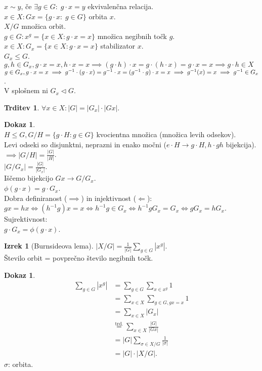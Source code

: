 \documentclass[a4paper, 12pt]{book}
\theoremstyle{definition}
\newtheorem{claim}[counter]{Trditev}
\newtheorem{theorem}[counter]{Izrek}
\newtheorem{pro}[counter]{Dokaz}
\theoremstyle{remark}
\begin{document}
$x \sim y$, če $\exists g \in G: \; g \cdot x = y$ ekvivalenčna relacija. \\
$x \in X: G x = \{g \cdot x: \; g \in G\}$ orbita $x$. \\
$X / G$ množica orbit. \\
$g \in G: x^g = \{x \in X: g \cdot x = x\}$ množica negibnih točk $g$. \\
$x \in X: G_x = \{x \in X: g \cdot x = x\}$ stabilizator $x$. \\
$G_x \leq G$. \\
$g, h \in G_x, g \cdot x = x, h \cdot x = x \implies (g \cdot h) \cdot x = g \cdot (h \cdot x) =
g \cdot x = x \implies g \cdot h \in X$ \\
$g \in G_x, g \cdot x = x \implies g^{-1} \cdot (g \cdot x) = g^{-1} \cdot x = (g^{-1} \cdot g) \cdot x = x \\
\implies g^{-1}(x) = x \implies g^{-1} \in G_x$. \\
V splošnem ni $G_x \triangleleft G$.
\begin{claim}
  $\forall x \in X: |G| = |G_x| \cdot |G x|$.
\end{claim}
\begin{pro} \text{} \\
  $H \leq G, G / H = \{g \cdot H: g \in G\}$ kvocientna množica (množica levih odsekov). \\
  Levi odseki so disjunktni, neprazni in enako močni ($e \cdot H \to g \cdot H, h \cdot g h$ bijekcija). \\
  $\implies |G / H| = \frac{|G|}{|H|}$. \\
  $|G / G_x| = \frac{|G|}{|G_x|}$. \\
  Iščemo bijekcijo $G x \to G / G_x$. \\
  $\phi(g \cdot x) = g \cdot G_x$. \\
  Dobra definiranost ($\implies$) in injektivnost ($\Longleftarrow$): \\
  $g x = h x \iff (h^{-1} g) x = x \iff h^{-1} g \in G_x \iff h^{-1} g G_x = G_x \iff g G_x = h G_x$. \\
  Sujrektivnost: \\
  $g \cdot G_x = \phi(g \cdot x)$.
\end{pro}
\begin{theorem}[Burnsideova lema]
  $|X / G| = \frac{1}{|G|} \sum_{g \in G} \left|x^g\right|$. \\
  Število orbit = povprečno število negibnih točk.
\end{theorem}
\begin{pro}
  \begin{align*}
    \sum_{g \in G} \left|x^g\right| &= \sum_{g \in G} \sum_{x \in x^g} 1 \\
    &= \sum_{x \in X} \sum_{g \in G, gx = x} 1 \\
    &= \sum_{x \in X} |G_x| \\
    &\stackrel{\text{trd.}}{=} \sum_{x \in X} \frac{|G|}{|G x|} \\
    &= |G| \sum_{\sigma \in X / G} \frac{1}{|\sigma|} \\
    &= |G| \cdot |X / G|.
  \end{align*}
  $\sigma$: orbita.
\end{pro}
\end{document}
